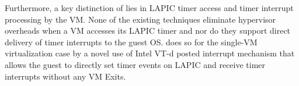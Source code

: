 Furthermore, a key distinction of \na lies in LAPIC timer
access and timer interrupt processing by the VM.
None of the existing techniques eliminate hypervisor overheads 
when a VM accesses its LAPIC timer and nor do they 
support direct delivery of timer interrupts to the guest OS.
\na does so for the single-VM virtualization case by a novel use of Intel VT-d posted 
interrupt mechanism that allows the guest to directly set timer events
on LAPIC and receive timer interrupts without any VM Exits.



%
